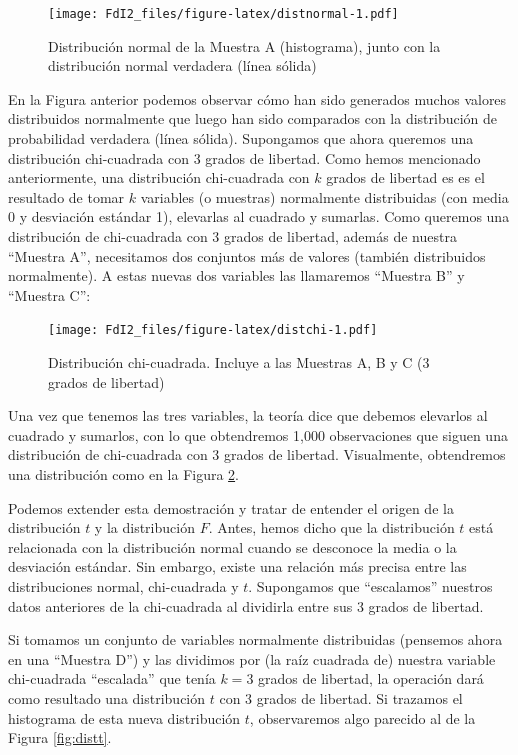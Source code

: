 \documentclass[spanish,]{book}
\begin{document}
\begin{figure}
\centering
\texttt{[image: FdI2\_files/figure-latex/distnormal-1.pdf]}
\caption{\label{fig:distnormal}Distribución normal de la Muestra A
(histograma), junto con la distribución normal verdadera (línea sólida)}
\end{figure}

En la Figura anterior podemos observar cómo han sido generados muchos
valores distribuidos normalmente que luego han sido comparados con la
distribución de probabilidad verdadera (línea sólida). Supongamos que
ahora queremos una distribución chi-cuadrada con 3 grados de libertad.
Como hemos mencionado anteriormente, una distribución chi-cuadrada con
\(k\) grados de libertad es es el resultado de tomar \(k\) variables (o
muestras) normalmente distribuidas (con media 0 y desviación estándar
1), elevarlas al cuadrado y sumarlas. Como queremos una distribución de
chi-cuadrada con 3 grados de libertad, además de nuestra ``Muestra A'',
necesitamos dos conjuntos más de valores (también distribuidos
normalmente). A estas nuevas dos variables las llamaremos ``Muestra B''
y ``Muestra C'':

\begin{figure}
\centering
\texttt{[image: FdI2\_files/figure-latex/distchi-1.pdf]}
\caption{\label{fig:distchi}Distribución chi-cuadrada. Incluye a las
Muestras A, B y C (3 grados de libertad)}
\end{figure}

Una vez que tenemos las tres variables, la teoría dice que debemos
elevarlos al cuadrado y sumarlos, con lo que obtendremos 1,000
observaciones que siguen una distribución de chi-cuadrada con 3 grados
de libertad. Visualmente, obtendremos una distribución como en la Figura
\ref{fig:distchi}.

Podemos extender esta demostración y tratar de entender el origen de la
distribución \(t\) y la distribución \(F\). Antes, hemos dicho que la
distribución \(t\) está relacionada con la distribución normal cuando se
desconoce la media o la desviación estándar. Sin embargo, existe una
relación más precisa entre las distribuciones normal, chi-cuadrada y
\(t\). Supongamos que ``escalamos'' nuestros datos anteriores de la
chi-cuadrada al dividirla entre sus 3 grados de libertad.

Si tomamos un conjunto de variables normalmente distribuidas (pensemos
ahora en una ``Muestra D'') y las dividimos por (la raíz cuadrada de)
nuestra variable chi-cuadrada ``escalada'' que tenía \(k=3\) grados de
libertad, la operación dará como resultado una distribución \(t\) con 3
grados de libertad. Si trazamos el histograma de esta nueva distribución
\(t\), observaremos algo parecido al de la Figura \ref{fig:distt}.
\end{document}
